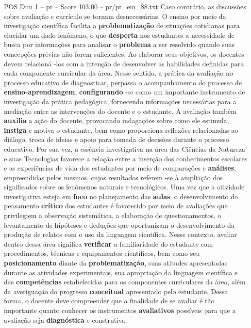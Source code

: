\begin{textsample}{POS Dim 1 – pr – Score 103.00 – pr/pr\_em\_88.txt}
Caso contrário, as discussões sobre avaliação e currículo se tornam desnecessárias.
O ensino por meio da investigação científica facilita a \textbf{problematização} de situações cotidianas para elucidar um dado fenômeno, o que \textbf{desperta} nos estudantes a necessidade de busca por informações para analisar o \textbf{problema} a ser resolvido quando suas concepções prévias não forem suficientes.
Ao elaborar seus objetivos, os docentes devem relacioná -los com a intenção de desenvolver as habilidades definidas para cada componente curricular da área.
Nesse sentido, a prática da avaliação no processo educativo de diagnosticar, perpassa o acompanhamento do processo de \textbf{ensino-aprendizagem}, \textbf{configurando} -se como um importante instrumento de investigação da prática pedagógica, fornecendo informações necessárias para a mediação entre as intervenções do docente e o estudante.
A avaliação também \textbf{auxilia} a ação do docente, provocando indagações sobre como ele estimula, \textbf{instiga} e motiva o estudante, bem como proporciona reflexões relacionadas ao diálogo, troca de ideias e apoio para tomada de decisões durante o processo educativo.
Por sua vez, a essência investigativa na área das Ciências da Natureza e suas Tecnologias favorece a relação entre a inserção dos conhecimentos escolares e as experiências de vida dos estudantes por meio de comparações e \textbf{análises}, empreendidas pelos mesmos, cujos resultados referem -se à ampliação dos significados sobre os fenômenos naturais e tecnológicos.
Uma vez que a atividade investigativa esteja em \textbf{foco} no planejamento das \textbf{aulas}, o desenvolvimento do pensamento \textbf{crítico} dos estudantes é favorecido por meio de avaliações que privilegiem a observação sistemática, a elaboração de questionamentos, o levantamento de hipóteses e deduções que oportunizam o desenvolvimento da produção de relatos com o uso da linguagem científica.
Nesse contexto, avaliar dentro dessa área significa \textbf{verificar} a familiaridade do estudante com procedimentos, técnicas e equipamentos científicos, bem como seu \textbf{posicionamento} diante da \textbf{problematização}, suas atitudes apresentadas durante as atividades experimentais, sua apropriação da linguagem científica e das \textbf{competências} estabelecidas para os componentes curriculares da área, além da averiguação do progresso \textbf{conceitual} apresentado pelo estudante.
Dessa forma, o docente deve compreender que a finalidade de se avaliar é tão importante quanto conhecer os instrumentos \textbf{avaliativos} possíveis para que a avaliação seja \textbf{diagnóstica} e construtiva.

\end{textsample}
